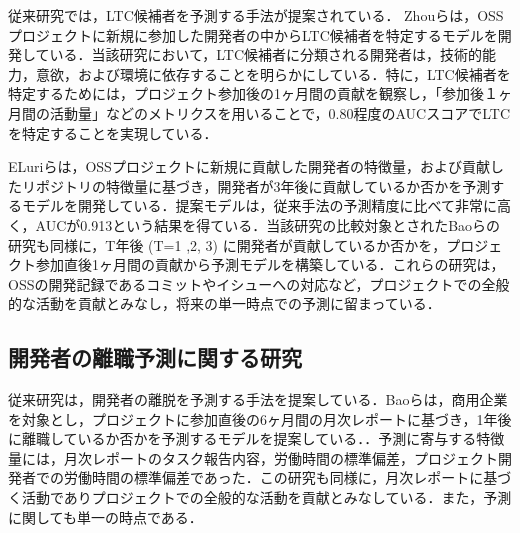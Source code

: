 \documentclass[submit,techrep,noauthor]{ipsj}
\begin{document}
従来研究では，LTC候補者を予測する手法が提案されている\cite{related1}\cite{LTC}．
Zhouらは，OSSプロジェクトに新規に参加した開発者の中からLTC候補者を特定するモデルを開発している\cite{LTC}．当該研究において，LTC候補者に分類される開発者は，技術的能力，意欲，および環境に依存することを明らかにしている．特に，LTC候補者を特定するためには，プロジェクト参加後の1ヶ月間の貢献を観察し，「参加後１ヶ月間の活動量」などのメトリクスを用いることで，0.80程度のAUCスコアでLTCを特定することを実現している．



ELuriらは，OSSプロジェクトに新規に貢献した開発者の特徴量，および貢献したリポジトリの特徴量に基づき，開発者が3年後に貢献しているか否かを予測するモデルを開発している\cite{related1}．提案モデルは，従来手法の予測精度に比べて非常に高く，AUCが0.913という結果を得ている．当該研究の比較対象とされたBaoらの研究も同様に，T年後 (T=1 ,2, 3) に開発者が貢献しているか否かを，プロジェクト参加直後1ヶ月間の貢献から予測モデルを構築している．これらの研究は，OSSの開発記録であるコミットやイシューへの対応など，プロジェクトでの全般的な活動を貢献とみなし，将来の単一時点での予測に留まっている．



\subsection{開発者の離職予測に関する研究}
従来研究は，開発者の離脱を予測する手法を提案している．Baoらは，商用企業を対象とし，プロジェクトに参加直後の6ヶ月間の月次レポートに基づき，1年後に離職しているか否かを予測するモデルを提案している．\cite{turnover}．予測に寄与する特徴量には，月次レポートのタスク報告内容，労働時間の標準偏差，プロジェクト開発者での労働時間の標準偏差であった．この研究も同様に，月次レポートに基づく活動でありプロジェクトでの全般的な活動を貢献とみなしている．また，予測に関しても単一の時点である．
\end{document}

